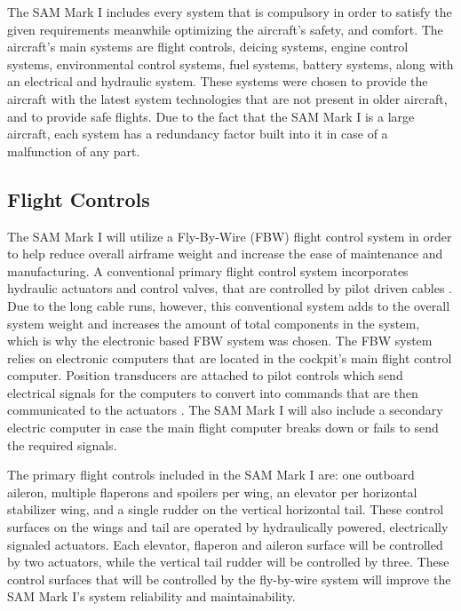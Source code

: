 The SAM Mark I includes every system that is compulsory in order to satisfy the given requirements meanwhile optimizing the aircraft's safety, and comfort. The aircraft's main systems are flight controls, deicing systems, engine control systems, environmental control systems, fuel systems, battery systems, along with an electrical and hydraulic system. These systems were chosen to provide the aircraft with the latest system technologies that are not present in older aircraft, and to provide safe flights. Due to the fact that the SAM Mark I is a large aircraft, each system has a redundancy factor built into it in case of a malfunction of any part. 

\subsection{Flight Controls}
The SAM Mark I will utilize a Fly-By-Wire (FBW) flight control system in order to help reduce overall airframe weight and increase the ease of maintenance and manufacturing. A conventional primary flight control system incorporates hydraulic actuators and control valves, that are controlled by pilot driven cables \cite{fbw}. Due to the long cable runs, however, this conventional system adds to the overall system weight and increases the amount of total components in the system, which is why the electronic based FBW system was chosen. The FBW system relies on electronic computers that are located in the cockpit’s main flight control computer. Position transducers are attached to pilot controls which send electrical signals for the computers to convert into commands that are then communicated to the actuators \cite{fbw}. The SAM Mark I will also include a secondary electric computer in case the main flight computer breaks down or fails to send the required signals.

The primary flight controls included in the SAM Mark I are: one outboard aileron, multiple flaperons and spoilers per wing, an elevator per horizontal stabilizer wing, and a single rudder on the vertical horizontal tail. These control surfaces on the wings and tail are operated by hydraulically powered, electrically signaled actuators. Each elevator, flaperon and aileron surface will be controlled by two actuators, while the vertical tail rudder will be controlled by three. These control surfaces that will be controlled by the fly-by-wire system will improve the SAM Mark I’s system reliability and maintainability.

